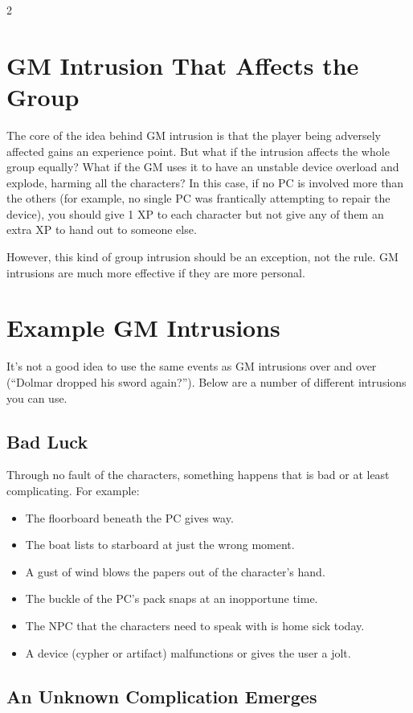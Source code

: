 \begin{multicols}{2}
\section{GM Intrusion That Affects the Group}

The core of the idea behind GM intrusion is that the player being adversely affected gains an experience point. But what if the intrusion affects the whole group equally? What if the GM uses it to have an unstable device overload and explode, harming all the characters? In this case, if no PC is involved more than the others (for example, no single PC was frantically attempting to repair the device), you should give 1 XP to each character but not give any of them an extra XP to hand out to someone else.

However, this kind of group intrusion should be an exception, not the rule. GM intrusions are much more effective if they are more personal.

\section{Example GM Intrusions}

It’s not a good idea to use the same events as GM intrusions over and over (“Dolmar dropped his sword again?”). Below are a number of different intrusions you can use.

\subsection{Bad Luck}

Through no fault of the characters, something happens that is bad or at least complicating. For example:

\begin{itemize}
\item The floorboard beneath the PC gives way.
\item The boat lists to starboard at just the wrong moment.
\item A gust of wind blows the papers out of the character’s hand.
\item The buckle of the PC’s pack snaps at an inopportune time.
\item The NPC that the characters need to speak with is home sick today.
\item A device (cypher or artifact) malfunctions or gives the user a jolt.
\end{itemize}

\subsection{An Unknown Complication Emerges}


\end{multicols}
